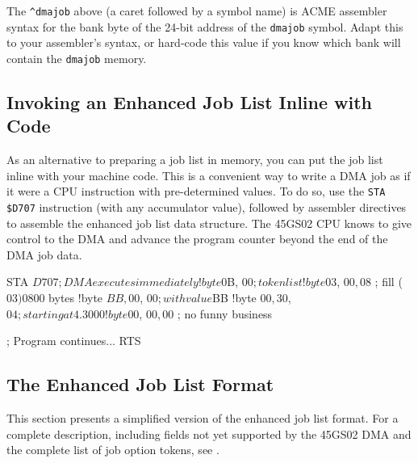 
The {\tt \^{}dmajob} above (a caret followed by a symbol name) is ACME assembler syntax for the bank byte of the 24-bit address of the {\tt dmajob} symbol. Adapt this to your assembler's syntax, or hard-code this value if you know which bank will contain the {\tt dmajob} memory.

\subsection{Invoking an Enhanced Job List Inline with Code}

As an alternative to preparing a job list in memory, you can put the job list inline with your machine code. This is a convenient way to write a DMA job as if it were a CPU instruction with pre-determined values. To do so, use the \texttt{STA \$D707} instruction (with any accumulator value), followed by assembler directives to assemble the enhanced job list data structure. The 45GS02 CPU knows to give control to the DMA and advance the program counter beyond the end of the DMA job data.

\begin{asmcode}
STA $D707  ; DMA executes immediately
!byte $0B, $00       ; token list
!byte $03, $00, $08  ; fill ($03) $0800 bytes
!byte $BB, $00, $00  ; with value $BB
!byte $00, $30, $04  ; starting at 4.3000
!byte $00, $00, $00  ; no funny business

; Program continues...
RTS
\end{asmcode}

\subsection{The Enhanced Job List Format}

This section presents a simplified version of the enhanced job list format. For a complete description, including fields not yet supported by the 45GS02 DMA and the complete list of job option tokens, see .

